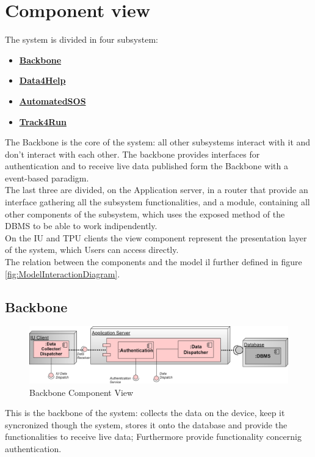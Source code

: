 \section{Component view}
\label{sect:ComponetView}
The system is divided in four subsystem:
\begin{itemize}
\item \textbf{\href{subsect:backboneComponentView}{Backbone}}
\item \textbf{\href{subsect:D4HComponentView}{Data4Help}}
\item \textbf{\href{subsect:ASOSComponentView}{AutomatedSOS}}
\item \textbf{\href{subsect:T4RComponentView}{Track4Run}}
\end{itemize}
The Backbone is the core of the system: all other subsystems interact with it and don't interact with each other. The backbone provides interfaces for authentication and to receive live data published form the Backbone with a event-based paradigm.\\
The last three are divided, on the Application server, in a router that provide an interface gathering all the subsystem functionalities, and a module, containing all other components of the subsystem, which uses the exposed method of the DBMS to be able to work indipendently. \\
On the IU and TPU clients the view component represent the presentation layer of the system, which Users can access directly.\\
The relation between the components and the model il further defined in figure \ref{fig:ModelInteractionDiagram}.
\subsection{Backbone}
\label{subsect:backboneComponentView}
\begin{figure}[H]
\caption{Backbone Component View}
\includegraphics[width = \textwidth]{sections/architecturalDesign/BackboneDiagram.png}
\end{figure}
This is the backbone of the system: collects the data on the device, keep it syncronized though the system, stores it onto the database and provide the functionalities to receive live data; Furthermore provide functionality concernig authentication.
